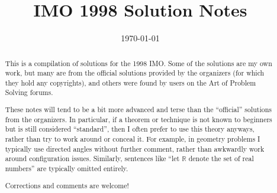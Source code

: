 \documentclass[11pt]{scrartcl}
\title{IMO 1998 Solution Notes}
\date{\today}
\begin{document}
\maketitle

\begin{abstract}
This is a compilation of solutions
for the 1998 IMO.
Some of the solutions are my own work,
but many are from the official solutions provided by the organizers
(for which they hold any copyrights),
and others were found by users on the Art of Problem Solving forums.

These notes will tend to be a bit more advanced and terse than the ``official''
solutions from the organizers.
In particular, if a theorem or technique is not known to beginners
but is still considered ``standard'', then I often prefer to
use this theory anyways, rather than try to work around or conceal it.
For example, in geometry problems I typically use directed angles
without further comment, rather than awkwardly work around configuration issues.
Similarly, sentences like ``let $\mathbb{R}$ denote the set of real numbers''
are typically omitted entirely.

Corrections and comments are welcome!
\end{abstract}

\tableofcontents
\newpage

\addtocounter{section}{-1}
\end{document}
